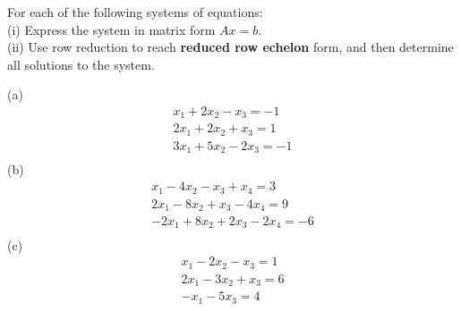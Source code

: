 \begin{question}	\normalfont
For each of the following systems of equations: \\
(i) Express the system in matrix form $Ax =b$. \\
(ii) Use row reduction to reach {\bf reduced row echelon} form,
and then  determine all solutions to the
system. 
	
\noindent (a) 	
\[
\begin{array}{r}
x_1 + 2x_2 - x_3 = -1\\ 
2x_1 + 2x_2 + x_3 = 1 \\
3x_1 + 5x_2 - 2x_3 = -1 \\
\end{array}
\]
\vspace{.2cm}
\noindent (b)
\[
\begin{array}{r}
x_1 - 4x_2 - x_3 + x_4 = 3 \\
2x_1 - 8 x_2 + x_3 -4x_4 = 9 \\
-2x_1 + 8 x_2 + 2x_3 -2x_4 = -6 \\
\end{array}
\]	
\vspace{.2cm}
\noindent (c) 
\[
\begin{array}{r}
x_1 -2x_2 -x_3 = 1\\
2x_1 - 3x_2 + x_3 = 6 \\
-x_1 -5x_3 = 4 \\
\end{array}
\]

\end{question}
